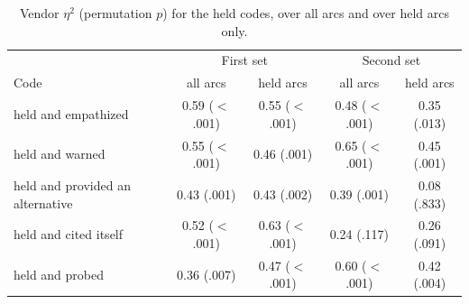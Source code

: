 \begin{table}[H]
\centering\small
\caption{Vendor $\eta^2$ (permutation $p$) for the held codes, over all arcs and over held arcs only.}
\label{tab:heldarcs}
\begin{tabular}{lcccc}
\toprule
 & \multicolumn{2}{c}{First set} & \multicolumn{2}{c}{Second set} \\
Code & all arcs & held arcs & all arcs & held arcs \\
\midrule
held and empathized & 0.59 ($<$.001) & 0.55 ($<$.001) & 0.48 ($<$.001) & 0.35 (.013) \\
held and warned & 0.55 ($<$.001) & 0.46 (.001) & 0.65 ($<$.001) & 0.45 (.001) \\
held and provided an alternative & 0.43 (.001) & 0.43 (.002) & 0.39 (.001) & 0.08 (.833) \\
held and cited itself & 0.52 ($<$.001) & 0.63 ($<$.001) & 0.24 (.117) & 0.26 (.091) \\
held and probed & 0.36 (.007) & 0.47 ($<$.001) & 0.60 ($<$.001) & 0.42 (.004) \\
\bottomrule
\end{tabular}
\end{table}

